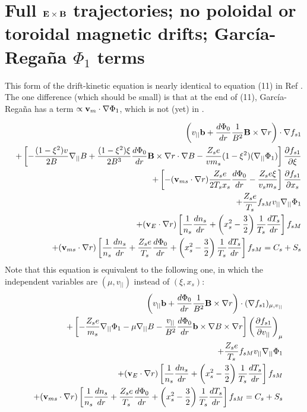 \section{Full ${\mathbf E}\times{\mathbf B}$ trajectories; no poloidal or toroidal magnetic drifts; Garc\'{i}a-Rega\~{n}a $\Phi_1$ terms}

This form of the drift-kinetic equation is nearly identical to equation (11) in Ref \cite{Regana2017}.
The one difference (which should be small) is that at the end of (11), Garc\'{i}a-Rega\~{n}a
has a term $\propto {\mathbf v}_m \cdot \nabla \Phi_1$, which is not (yet) in \sfincs.

\begin{eqnarray}
&&\left(v_{||}{\mathbf b} + \frac{d\Phi_0}{dr} \frac{1}{B^2} {\mathbf B}\times\nabla r \right) \cdot \nabla f_{s1} \\
&&+ \left[ - \frac{(1-\xi^2)v}{2B} \nabla_{||} B
+\frac{(1-\xi^2)\xi}{2B^3} \frac{d\Phi_0}{dr}{\mathbf B}\times\nabla r\cdot\nabla B 
-\frac{Z_s e}{v m_s}(1-\xi^2)(\nabla_{||}\Phi_1)
\right]
 \frac{\partial f_{s1}}{\partial \xi} \nonumber \\
&&+ \left[
-({\mathbf v}_{ms} \cdot\nabla r) \frac{Z_s e}{2 T_s x_s} \frac{d\Phi_0}{dr} 
-\frac{Z_s e \xi}{v_s m_s}
\right] \frac{\partial f_{s1}}{\partial x_s} \nonumber \\
&&+\frac{Z_s e}{T_s} f_{sM} v_{||} \nabla_{||} \Phi_1 \nonumber \\
&& + ({\mathbf v}_E \cdot \nabla r) \left[ \frac{1}{n_s} \frac{dn_s}{dr}  + \left(x_s^2-\frac{3}{2}\right) \frac{1}{T_s} \frac{dT_s}{dr}\right] f_{sM} \nonumber \\
&&+ ({\mathbf v}_{ms} \cdot \nabla r) \left[ \frac{1}{n_s} \frac{dn_s}{dr} + \frac{Z_s e}{T_s} \frac{d\Phi_0}{dr} + \left(x_s^2-\frac{3}{2}\right) \frac{1}{T_s} \frac{dT_s}{dr}\right] f_{sM}
 = C_s + S_s \nonumber
\end{eqnarray}
Note that this equation is equivalent to the following one, in which the independent variables
are $(\mu,v_{||})$ instead of $(\xi,x_s)$:
\begin{eqnarray}
&&\left(v_{||}{\mathbf b} + \frac{d\Phi_0}{dr} \frac{1}{B^2} {\mathbf B}\times\nabla r \right) \cdot (\nabla f_{s1})_{\mu, v_{||}} \\
&&+ \left[ -\frac{Z_s e}{m_s} \nabla_{||} \Phi_1
- \mu \nabla_{||} B
-\frac{v_{||}}{B^2} \frac{d\Phi_0}{dr} {\mathbf b}\times\nabla B \times \nabla r \right]
\left( \frac{\partial f_{s1}}{\partial v_{||}} \right)_{\mu} \nonumber \\
&&+\frac{Z_s e}{T_s} f_{sM} v_{||} \nabla_{||} \Phi_1 \nonumber \\
&& + ({\mathbf v}_E \cdot \nabla r) \left[ \frac{1}{n_s} \frac{dn_s}{dr}  + \left(x_s^2-\frac{3}{2}\right) \frac{1}{T_s} \frac{dT_s}{dr}\right] f_{sM} \nonumber \\
&& + ({\mathbf v}_{ms} \cdot \nabla r) \left[ \frac{1}{n_s} \frac{dn_s}{dr} + \frac{Z_s e}{T_s} \frac{d\Phi_0}{dr} + \left(x_s^2-\frac{3}{2}\right) \frac{1}{T_s} \frac{dT_s}{dr}\right] f_{sM}
=C_s + S_s \nonumber
\end{eqnarray}
